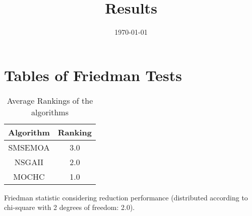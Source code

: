 \documentclass{article}
\title{Results}
\author{}
\date{\today}
\begin{document}
\oddsidemargin 0in \topmargin 0in\maketitle
\section{Tables of Friedman Tests}
\begin{table}[!htp]
\centering
\caption{Average Rankings of the algorithms
}\begin{tabular}{c|c}
Algorithm&Ranking\\
\hline
SMSEMOA&3.0\\
NSGAII&2.0\\
MOCHC&1.0\\
\end{tabular}
\end{table}


Friedman statistic considering reduction performance (distributed according to chi-square with 2 degrees of freedom: 2.0).
\end{document}

